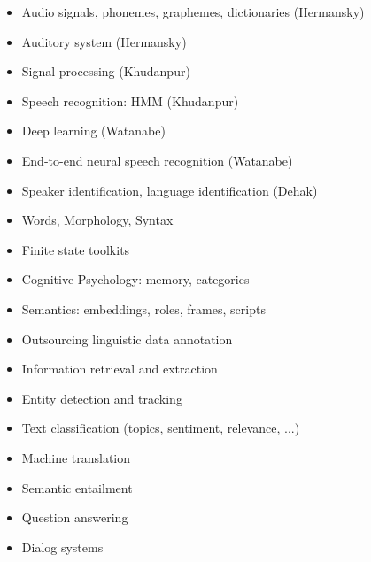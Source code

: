 \documentclass[landscape]{jhuslides3C}
\begin{document}

\vfill
\begin{itemize} \itemsep 0mm
\item Audio signals, phonemes, graphemes, dictionaries (Hermansky)
\item Auditory system (Hermansky)
\item Signal processing (Khudanpur)
\item Speech recognition: HMM (Khudanpur)
\item Deep learning (Watanabe) 
\item End-to-end neural speech recognition (Watanabe) 
\item Speaker identification, language identification (Dehak)
\end{itemize}
\vfill


\vfill
\begin{itemize} \itemsep 0mm
\item Words, Morphology, Syntax 
\item Finite state toolkits
\item Cognitive Psychology: memory, categories 
\item Semantics: embeddings, roles, frames, scripts
\item Outsourcing linguistic data annotation
\item Information retrieval and extraction
\item Entity detection and tracking
\item Text classification (topics, sentiment, relevance, ...)
\item Machine translation
\item Semantic entailment
\item Question answering
\item Dialog systems
\end{itemize}
\vfill

\end{document}
